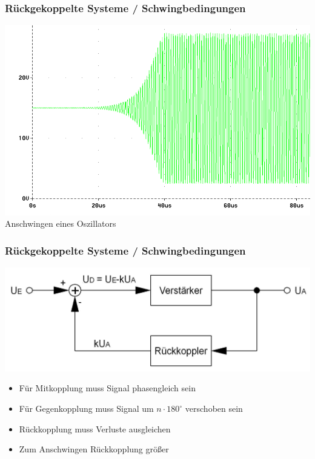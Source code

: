 \begin{frame}
    \frametitle{Rückgekoppelte Systeme / Schwingbedingungen}
    \begin{center}
        \includegraphics[width=1\textwidth,height=.6\textheight,keepaspectratio]{a07/Oszillator_Anschwingen.png}
	{\tiny \hyperlink{refs}{\cite{wm}}} \\[2em]
	Anschwingen eines Oszillators
     \end{center}
\end{frame}

\begin{frame}
    \frametitle{Rückgekoppelte Systeme / Schwingbedingungen}
        \begin{center}
        \includegraphics[width=1\textwidth,height=.5\textheight,keepaspectratio]{a07/Gegenkopplung.png}
	{\tiny \hyperlink{refs}{\cite{wm}}} \\[2em]
     \end{center}
    \begin{itemize}
			\item Für Mitkopplung muss Signal phasengleich sein
			\item Für Gegenkopplung muss Signal um $n \cdot 180^{\circ}$ verschoben sein
			\item Rückkopplung muss Verluste ausgleichen
			\item Zum Anschwingen Rückkopplung größer
    \end{itemize}
\end{frame}

